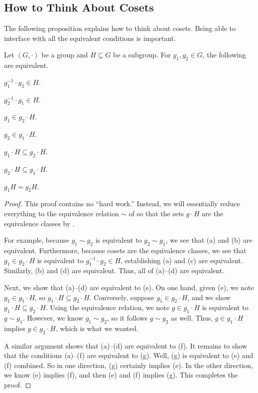 \documentclass[../main.tex]{subfiles}
\begin{document}
\subsection{How to Think About Cosets}
The following proposition explains how to think about cosets. Being able to interface with all the equivalent conditions is important.
\begin{proposition} \label{prop:how-to-coset}
    Let $(G,\cdot)$ be a group and $H\subseteq G$ be a subgroup. For $g_1,g_2\in G$, the following are equivalent.
    \begin{listalph}
        \item $g_1^{-1}\cdot g_2\in H$.
        \item $g_2^{-1}\cdot g_1\in H$.
        \item $g_1\in g_2\cdot H$.
        \item $g_2\in g_1\cdot H$.
        \item $g_1\cdot H\subseteq g_2\cdot H$.
        \item $g_2\cdot H\subseteq g_1\cdot H$.
        \item $g_1H=g_2H$.
    \end{listalph}
\end{proposition}
\begin{proof}
    This proof contains no ``hard work.'' Instead, we will essentially reduce everything to the equivalence relation $\sim$ of  so that the sets $g\cdot H$ are the equivalence classes by .

    For example, because $g_1\sim g_2$ is equivalent to $g_2\sim g_1$, we see that (a) and (b) are equivalent. Furthermore, because cosets are the equivalence classes, we see that $g_1\in g_2\cdot H$ is equivalent to $g_1^{-1}\cdot g_2\in H$, establishing (a) and (c) are equivalent. Similarly, (b) and (d) are equivalent. Thus, all of (a)--(d) are equivalent.
    
    Next, we show that (a)--(d) are equivalent to (e). On one hand, given (e), we note $g_1\in g_1\cdot H$, so $g_1\cdot H\subseteq g_2\cdot H$. Conversely, suppose $g_1\in g_2\cdot H$, and we show $g_1\cdot H\subseteq g_2\cdot H$. Using the equivalence relation, we note $g\in g_1\cdot H$ is equivalent to $g\sim g_1$. However, we know $g_1\sim g_2$, so it follows $g\sim g_2$ as well. Thus, $g\in g_1\cdot H$ implies $g\in g_2\cdot H$, which is what we wanted.
    
    A similar argument shows that (a)--(d) are equivalent to (f). It remains to show that the conditions (a)--(f) are equivalent to (g). Well, (g) is equivalent to (e) and (f) combined. So in one direction, (g) certainly implies (e). In the other direction, we know (e) implies (f), and then (e) and (f) implies (g). This completes the proof.
\end{proof}
\end{document}
